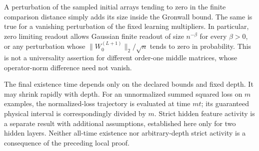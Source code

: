 A perturbation of the sampled initial arrays tending to zero in the
finite comparison distance simply adds its size inside the Gronwall
bound.  The same is true for a vanishing perturbation of the fixed
learning multipliers.  In particular, zero limiting readout allows
Gaussian finite readout of size $n^{-\beta}$ for every $\beta>0$, or
any perturbation whose $\|W_0^{(L+1)}\|_2/\sqrt n$ tends to zero in
probability.  This is not a universality assertion for different
order-one middle matrices, whose operator-norm difference need not
vanish.

The final existence time depends only on the declared bounds and fixed
depth.  It may shrink rapidly with depth.  For an unnormalized summed
squared loss on $m$ examples, the normalized-loss trajectory is evaluated
at time $mt$; its guaranteed physical interval is correspondingly
divided by $m$.  Strict hidden feature activity is a separate result
with additional assumptions, established here only for two hidden
layers.  Neither all-time existence nor arbitrary-depth strict activity
is a consequence of the preceding local proof.
